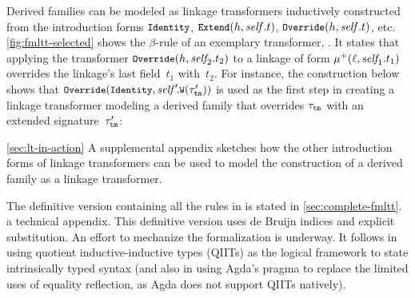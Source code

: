 Derived families can be modeled as linkage transformers inductively
constructed from the introduction forms
$\small\texttt{Identity}$, $\small\texttt{Extend}({h},{\mathit{self}.t})$, $\small\texttt{Override}({h},{\mathit{self}.t})$, %
etc.
\cref{fig:fmltt-selected} shows the $\beta$-rule of an exemplary transformer,
.
It states that applying the transformer $\small\texttt{Override}({h},{\mathit{self}_{\!2}.t_2})$ to
a linkage of form $\mu^+({\ell},{\mathit{self}_{\!1}.t_1})$
overrides the linkage's last field~$t_1$ with~$t_2$.
For instance, the construction below shows that 
$\small\texttt{Override}({\texttt{Identity}},{\mathit{self}'\!.\texttt{W}({\tau'_{\texttt{tm}}})})$
is used as the first step in creating a linkage transformer modeling a derived family that
overrides $\tau_{\texttt{tm}}$ with an extended
signature~$\tau'_{\texttt{tm}}$:
\vspace{.9ex}

\noindent


\noindent
\ifreport \cref{sec:lt-in-action}
\else A supplemental appendix
\fi
sketches how the other introduction forms of linkage transformers
can be used to model the construction of a derived family as a linkage transformer.



The definitive version containing all the rules in \TT is stated in
\ifreport \cref{sec:complete-fmltt}.
\else a technical appendix.
\fi
This definitive version uses de Bruijn indices and explicit substitution.
An effort to mechanize the formalization is underway. It follows \citet{altkap2016}
in using quotient inductive-inductive types (QIITs) as 
the logical framework to state intrinsically typed syntax (and also
in using Agda's  pragma to replace the limited uses of equality
reflection, as Agda does not support QIITs natively).


